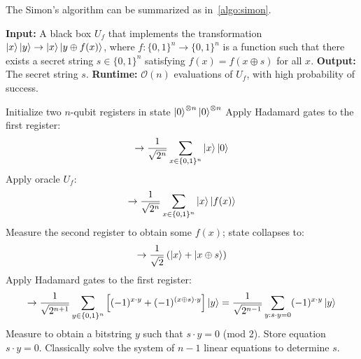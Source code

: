 The Simon's algorithm can be summarized as in~\ref{algo:simon}.
\begin{algorithm}
    \caption{Simon's Algorithm}
    \begin{algorithmic}[1]
    \State \textbf{Input:} A black box $U_f$ that implements the transformation $\ket{x}\ket{y} \rightarrow \ket{x}\ket{y \oplus f(x)}$, where $f: \{0,1\}^n \rightarrow \{0,1\}^n$ is a function such that there exists a secret string $s \in \{0,1\}^n$ satisfying $f(x) = f(x \oplus s)$ for all $x$.
    \State \textbf{Output:} The secret string $s$.
    \State \textbf{Runtime:} $\mathcal{O}(n)$ evaluations of $U_f$, with high probability of success.
    
        \State Initialize two $n$-qubit registers in state $\ket{0}^{\otimes n} \ket{0}^{\otimes n}$
        \State Apply Hadamard gates to the first register:
        \[
        \rightarrow \frac{1}{\sqrt{2^n}} \sum_{x\in\{0,1\}^n} \ket{x} \ket{0}
        \]
        \State Apply oracle $U_f$:
        \[
        \rightarrow \frac{1}{\sqrt{2^n}} \sum_{x\in\{0,1\}^n} \ket{x} \ket{f(x)}
        \]
        \State Measure the second register to obtain some $f(x)$; state collapses to:
        \[
        \rightarrow \frac{1}{\sqrt{2}} \left( \ket{x} + \ket{x \oplus s} \right)
        \]
        \State Apply Hadamard gates to the first register:
        \[
        \rightarrow \frac{1}{\sqrt{2^{n+1}}} \sum_{y \in \{0,1\}^n} \left[ (-1)^{x \cdot y} + (-1)^{(x \oplus s) \cdot y} \right] \ket{y}= \frac{1}{\sqrt{2^{n-1}}} \sum_{y : s \cdot y = 0} (-1)^{x \cdot y} \ket{y}
        \]
        \State Measure to obtain a bitstring $y$ such that $s \cdot y = 0$ (mod 2).
        \State Store equation $s \cdot y = 0$.
    \EndFor
    \State Classically solve the system of $n-1$ linear equations to determine $s$.
    \end{algorithmic}
    \label{algo:simon}
\end{algorithm}

